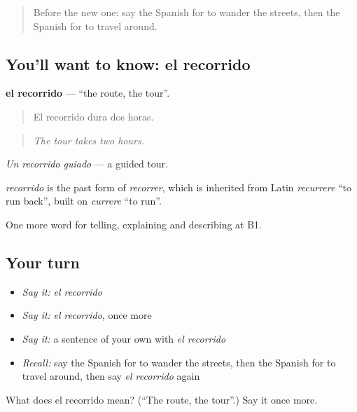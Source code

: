 \label{lesson:ES-C674-recorrido}



\begin{quote}
Before the new one: say the Spanish for to wander the streets, then the Spanish for to travel around.
\end{quote}

\subsection*{You'll want to know: el recorrido}
\textbf{el recorrido} — \textquotedblleft{}the route, the tour\textquotedblright{}.

\begin{quote}
El recorrido dura dos horas.
\end{quote}

\begin{quote}
\emph{The tour takes two hours.}
\end{quote}

\emph{Un recorrido guiado} — a guided tour.

\begin{cousinweb}
\emph{recorrido} is the past form of \emph{recorrer}, which is inherited from Latin \emph{recurrere} \textquotedblleft{}to run back\textquotedblright{}, built on \emph{currere} \textquotedblleft{}to run\textquotedblright{}.
\end{cousinweb}

\begin{grammarlens}[title={What you've built}]
One more word for telling, explaining and describing at B1.
\end{grammarlens}

\subsection*{Your turn}
\begin{itemize}
\raggedright
  \item \emph{Say it:} \emph{el recorrido}
  \item \emph{Say it:} \emph{el recorrido}, once more
  \item \emph{Say it:} a sentence of your own with \emph{el recorrido}
  \item \emph{Recall:} say the Spanish for to wander the streets, then the Spanish for to travel around, then say \emph{el recorrido} again
\end{itemize}

\begin{tcolorbox}[breakable,colback=teal!4,colframe=teal!35!black,title={Before you move on}]
What does el recorrido mean? (\textquotedblleft{}The route, the tour\textquotedblright{}.) Say it once more.
\end{tcolorbox}
